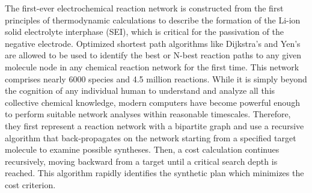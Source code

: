 \documentclass[%
 aip,
 jmp,%
 amsmath,amssymb,
 reprint,%
]{revtex4-2}
\begin{document}
The first-ever electrochemical reaction network is constructed from the first principles of thermodynamic calculations 
to describe the formation of the Li-ion solid electrolyte interphase (SEI), which is critical for the 
passivation of the negative electrode. Optimized shortest path algorithms like Dijkstra's and Yen's 
are allowed to be used to identify the best or N-best reaction paths to any given molecule node in
any chemical reaction network for the first time. This network comprises nearly 6000 species and 4.5 million reactions.
While it is simply beyond the cognition of any individual human to understand and analyze all this
collective chemical knowledge, modern computers have become powerful enough to perform suitable network
analyses within reasonable timescales. Therefore, they first represent a reaction network with a bipartite graph
and use a recursive algorithm that back-propagates on the network starting from a specified target molecule 
to examine possible syntheses. Then, a cost calculation continues recursively, moving backward from a target until a critical 
search depth is reached. This algorithm rapidly identifies the synthetic plan which minimizes the cost
criterion.
\end{document}
